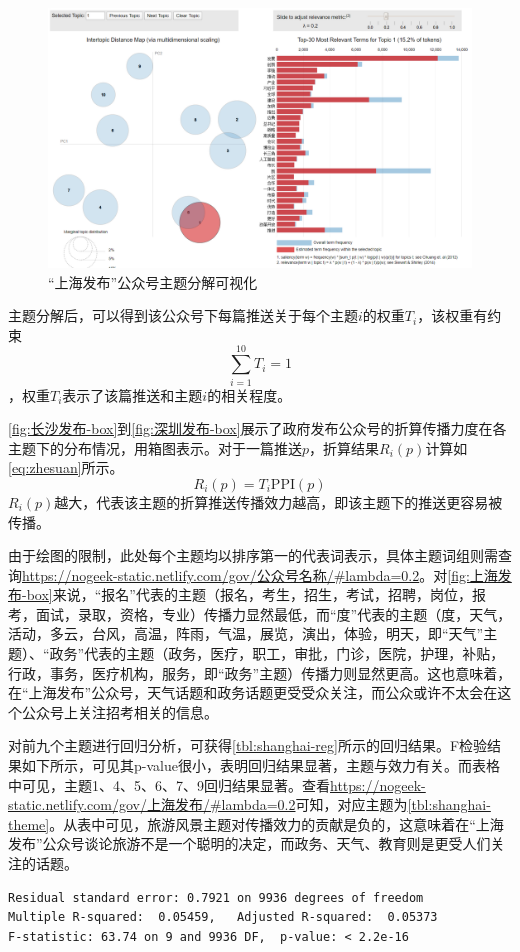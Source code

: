 \documentclass[a4paper,12pt,UTF8]{article}
\begin{document}
    \begin{figure}[htbp]
      \centering
      \includegraphics[width=0.9\linewidth]{shanghai-vis.png}
      \caption{“上海发布”公众号主题分解可视化}
      \label{fig:shanghai-vis}
    \end{figure}

    主题分解后，可以得到该公众号下每篇推送关于每个主题$i$的权重$T_i$，该权重有约束$$\sum_{i=1}^{10}T_i=1$$，权重$T_i$表示了该篇推送和主题$i$的相关程度。

    \cref{fig:长沙发布-box}到\cref{fig:深圳发布-box}展示了政府发布公众号的折算传播力度在各主题下的分布情况，用箱图表示。对于一篇推送$p$，折算结果$R_i(p)$计算如\cref{eq:zhesuan}所示。
    \begin{equation}
      \label{eq:zhesuan}
      R_i(p) = T_i\text{PPI}(p)
    \end{equation}
    $R_i(p)$越大，代表该主题的折算推送传播效力越高，即该主题下的推送更容易被传播。
    
    由于绘图的限制，此处每个主题均以排序第一的代表词表示，具体主题词组则需查询\url{https://nogeek-static.netlify.com/gov/公众号名称/#lambda=0.2}。对\cref{fig:上海发布-box}来说，“报名”代表的主题（报名，考生，招生，考试，招聘，岗位，报考，面试，录取，资格，专业）传播力显然最低，而“度”代表的主题（度，天气，活动，多云，台风，高温，阵雨，气温，展览，演出，体验，明天，即“天气”主题）、“政务”代表的主题（政务，医疗，职工，审批，门诊，医院，护理，补贴，行政，事务，医疗机构，服务，即“政务”主题）传播力则显然更高。这也意味着，在“上海发布”公众号，天气话题和政务话题更受受众关注，而公众或许不太会在这个公众号上关注招考相关的信息。

    对前九个主题进行回归分析，可获得\cref{tbl:shanghai-reg}所示的回归结果。F检验结果如下所示，可见其p-value很小，表明回归结果显著，主题与效力有关。而表格中可见，主题1、4、5、6、7、9回归结果显著。查看\url{https://nogeek-static.netlify.com/gov/上海发布/#lambda=0.2}可知，对应主题为\cref{tbl:shanghai-theme}。从表中可见，旅游风景主题对传播效力的贡献是负的，这意味着在“上海发布”公众号谈论旅游不是一个聪明的决定，而政务、天气、教育则是更受人们关注的话题。
    \begin{lstlisting}
Residual standard error: 0.7921 on 9936 degrees of freedom
Multiple R-squared:  0.05459,	Adjusted R-squared:  0.05373 
F-statistic: 63.74 on 9 and 9936 DF,  p-value: < 2.2e-16
    \end{lstlisting}
    
\end{document}
